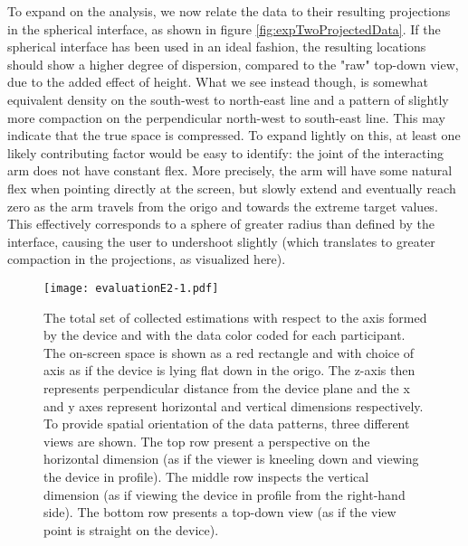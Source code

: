To expand on the analysis, we now relate the data to their resulting projections in the spherical interface, as shown in figure \ref{fig:expTwoProjectedData}. If the spherical interface has been used in an ideal fashion, the resulting locations should show a higher degree of dispersion, compared to the "raw" top-down view, due to the added effect of height\fn{\sphereProjectNote}. What we see instead though, is somewhat equivalent density on the south-west to north-east line and  a pattern of slightly more compaction on the perpendicular north-west to south-east line. This may  indicate that the true space is compressed. To expand lightly on this,  at least one likely contributing factor would be easy to identify: the joint of the interacting arm does not have constant flex. More precisely, the arm will have some natural flex when pointing  directly at the screen, but slowly extend and eventually reach zero as the arm travels from the origo and towards the extreme target values. This effectively corresponds to a sphere of greater radius than defined by the interface, causing the user to undershoot slightly (which translates to greater compaction in the projections, as visualized here). 





\onecolumn

\begin{figure*}[!ht]
	\vspace*{-1cm}
	\centering
	\caption{The total set of collected estimations with respect to the axis formed by the device and with the data  color coded for each participant. The on-screen space is shown as a red rectangle and with choice of axis as if the device is lying flat down in the origo. The z-axis then represents perpendicular distance from the device plane and the x and y axes represent horizontal and vertical dimensions respectively. To provide spatial orientation of the data patterns, three different views are shown. The top row present a perspective on the horizontal dimension (as if the viewer is kneeling down and viewing the device in profile). The  middle row inspects the vertical dimension (as if viewing the device in profile from the right-hand side). The bottom row presents a top-down view (as if the view point is straight on the device).}
	\label{fig:expTwoViewPoints}			
	\hspace*{-1cm}
	\texttt{[image: evaluationE2-1.pdf]}
\end{figure*}


